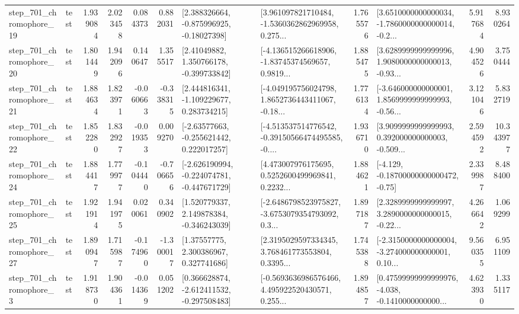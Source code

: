 \begin{tabular}{llrrrrllrlrr}
  step\_701\_chromophore\_19 &      test &      1.939084 &    2.023458 &      0.084373 &  0.882031 &    [2.388326664, -0.875996925, -0.18027398] &  [3.961097821710484, -1.5360362862969958, 0.275... &       1.765576 &  [3.6510000000000034, -1.7860000000000014, -0.2... &            5.917684 &          8.930264 \\
  step\_701\_chromophore\_20 &      test &      1.801449 &    1.942096 &      0.140647 &  1.355517 &     [2.41049882, 1.350766178, -0.399733842] &  [-4.136515266618906, -1.83745374569657, 0.9819... &       1.885475 &  [3.6289999999999996, 1.9080000000000013, -0.93... &            4.904526 &          3.750444 \\
  step\_701\_chromophore\_21 &      test &      1.884634 &    1.823971 &     -0.060663 & -0.338315 &    [2.444816341, -1.109229677, 0.283734215] &  [-4.049195756024798, 1.8652736443411067, -0.18... &       1.776134 &  [-3.646000000000001, 1.8569999999999993, -0.56... &            3.121046 &          5.832719 \\
  step\_701\_chromophore\_22 &      test &      1.852280 &    1.832927 &     -0.019353 &  0.009270 &    [-2.63577663, -0.255621442, 0.222017257] &  [-4.513537514776542, -0.39150566474495585, -0.... &       1.936710 &  [3.9099999999999993, 0.392000000000003, -0.509... &            2.594592 &         10.343977 \\
  step\_701\_chromophore\_24 &      test &      1.884417 &    1.779977 &     -0.104440 & -0.706656 &  [-2.626190994, -0.224074781, -0.447671729] &  [4.473007976175695, 0.5252600499969841, 0.2232... &       1.884621 &              [-4.129, -0.18700000000000472, -0.75] &            2.339987 &          8.488400 \\
  step\_701\_chromophore\_25 &      test &      1.921914 &    1.941975 &      0.020061 &  0.340902 &    [1.520779337, 2.149878384, -0.346243039] &  [-2.6486798523975827, -3.6753079354793092, 0.3... &       1.897187 &  [2.3289999999999997, 3.2890000000000015, -0.22... &            4.266642 &          1.069299 \\
  step\_701\_chromophore\_27 &      test &      1.890947 &    1.715987 &     -0.174960 & -1.300017 &      [1.37557775, 2.300386967, 0.327741686] &  [2.3195029597334345, 3.768461773553804, 0.3395... &       1.745388 &  [-2.3150000000000004, -3.274000000000001, 0.10... &            9.560355 &          6.951109 \\
   step\_701\_chromophore\_3 &      test &      1.918730 &    1.904361 &     -0.014369 &  0.051202 &   [0.366628874, -2.612411532, -0.297508483] &  [-0.5693636986576466, 4.495922520430571, 0.255... &       1.894857 &  [0.47599999999999976, -4.038, -0.1410000000000... &            4.623930 &          1.335117 \\

\end{tabular}
